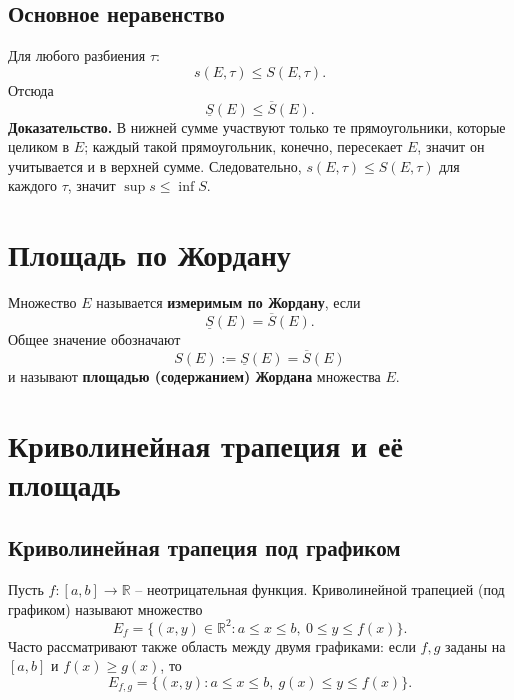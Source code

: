 \documentclass[14pt]{extreport}
\begin{document}
    \subsection{Основное неравенство}
    Для любого разбиения $\tau$:
    \[
    s(E,\tau) \leq S(E,\tau).
    \]
    Отсюда
    \[
    \underline{S}(E) \leq \overline{S}(E).
    \]
    \textbf{Доказательство.} В нижней сумме участвуют только те прямоугольники, которые целиком в $E$; каждый такой прямоугольник, конечно, пересекает $E$, значит он учитывается и в верхней сумме. Следовательно, $s(E,\tau) \leq S(E,\tau)$ для каждого $\tau$, значит $\sup s \leq \inf S$.

    \section{Площадь по Жордану}
    \begin{definition}
        Множество $E$ называется \textbf{измеримым по Жордану}, если
        \[
        \underline{S}(E) = \overline{S}(E).
        \]
        Общее значение обозначают
        \[
        S(E) := \underline{S}(E) = \overline{S}(E)
        \]
        и называют \textbf{площадью (содержанием) Жордана} множества $E$.
    \end{definition}

    \section{Криволинейная трапеция и её площадь}
    \subsection{Криволинейная трапеция под графиком}
    Пусть $f: [a,b] \rightarrow \mathbb{R}$ – неотрицательная функция. Криволинейной трапецией (под графиком) называют множество
    \[
    E_f = \{ (x,y) \in \mathbb{R}^2: a \leq x \leq b,\ 0 \leq y \leq f(x) \}.
    \]
    Часто рассматривают также область между двумя графиками: если $f,g$ заданы на $[a,b]$ и $f(x) \geq g(x)$, то
    \[
    E_{f,g} = \{ (x,y): a \leq x \leq b,\ g(x) \leq y \leq f(x) \}.
    \]
\end{document}
